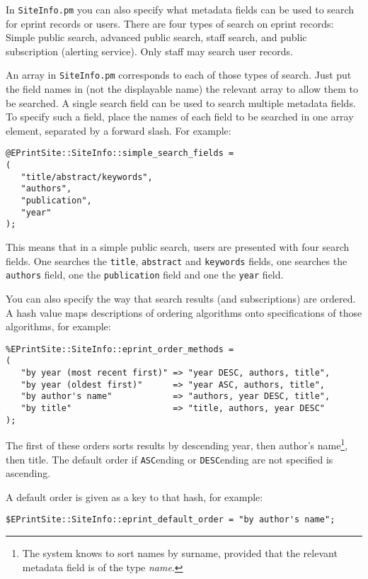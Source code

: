 {In {\tt SiteInfo.pm} you can also specify what metadata fields can be used to search for eprint records or users. There are four types of search on eprint records: Simple public search, advanced public search, staff search, and public subscription (alerting service). Only staff may search user records.

An array in {\tt SiteInfo.pm} corresponds to each of those types of search. Just put the field names in (not the displayable name) the relevant array to allow them to be searched. A single search field can be used to search multiple metadata fields. To specify such a field, place the names of each field to be searched in one array element, separated by a forward slash. For example:

\begin{verbatim}
@EPrintSite::SiteInfo::simple_search_fields =
(
   "title/abstract/keywords",
   "authors",
   "publication",
   "year"
);
\end{verbatim}

This means that in a simple public search, users are presented with four search fields. One searches the {\tt title}, {\tt abstract} and {\tt keywords} fields, one searches the {\tt authors} field, one the {\tt publication} field and one the {\tt year} field.

You can also specify the way that search results (and subscriptions) are ordered. A hash value maps descriptions of ordering algorithms onto specifications of those algorithms, for example:

\begin{verbatim}
%EPrintSite::SiteInfo::eprint_order_methods =
(
   "by year (most recent first)" => "year DESC, authors, title",
   "by year (oldest first)"      => "year ASC, authors, title",
   "by author's name"            => "authors, year DESC, title",
   "by title"                    => "title, authors, year DESC"
);
\end{verbatim}

The first of these orders sorts results by descending year, then author's name\footnote{The system knows to sort names by surname, provided that the relevant metadata field is of the type \emph{name}.}, then title. The default order if {\tt ASC}ending or {\tt DESC}ending are not specified is ascending.

A default order is given as a key to that hash, for example:

\begin{verbatim}
$EPrintSite::SiteInfo::eprint_default_order = "by author's name";
\end{verbatim}

}
